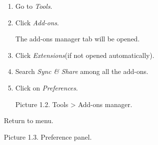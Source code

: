 \documentclass{article}
\begin{document}
\begin{description}
\begin{enumerate}
												\begin{enumerate}
													\item Go to \emph{Tools}.
													\item Click \emph{Add-ons}.
													\par The add-ons manager tab will be opened.
													\item Click \emph{Extensions}(if not opened automatically).
													\item Search \emph{Sync \& Share} among all the add-ons.
													\item Click on \emph{Preferences}.
													
														
														
														
															Picture 1.2. Tools > Add-ons manager.
														
													
													
												\end{enumerate}
											
											 
													Return to menu.
										\end{enumerate}
									
								
							\item[\textbf{\subsubsection*{1.2.Preferences}}
								]
									
										\begin{enumerate}
											
												
												
													Picture 1.3. Preference panel.
												
											
											

\end{enumerate}
\end{description}
\end{document}
